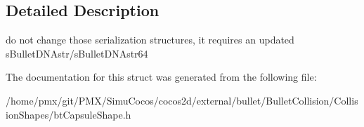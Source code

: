 \subsection{Detailed Description}
do not change those serialization structures, it requires an updated s\+Bullet\+D\+N\+Astr/s\+Bullet\+D\+N\+Astr64 

The documentation for this struct was generated from the following file\+:\begin{DoxyCompactItemize}
\item 
/home/pmx/git/\+P\+M\+X/\+Simu\+Cocos/cocos2d/external/bullet/\+Bullet\+Collision/\+Collision\+Shapes/bt\+Capsule\+Shape.\+h\end{DoxyCompactItemize}
